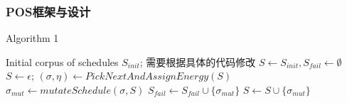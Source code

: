 \subsubsection{POS框架与设计}

\begin{algorithm}[!ht]
\caption{Algorithm 1}
\label{power}
\begin{algorithmic}[1]
    \REQUIRE  Initial corpus of schedules $S_{init}$; %
    需要根据具体的代码修改
    \STATE $S \leftarrow S_{init}, S_{fail} \leftarrow \emptyset$
     \STATE $S \leftarrow {\epsilon}$;
    \ENDIF
    \REPEAT
        \STATE $(\sigma, \eta) \leftarrow PickNextAndAssignEnergy(S)$
            \STATE $\sigma_{mut} \leftarrow mutateSchedule(\sigma, S)$
             \STATE $S_{fail} \leftarrow S_{fail} \cup \{\sigma_{mut}\}$
            \ENDIF
             \STATE $S \leftarrow S \cup \{\sigma_{mut}\}$
            \ENDIF
        \ENDFOR
\end{algorithmic}  
\end{algorithm}

